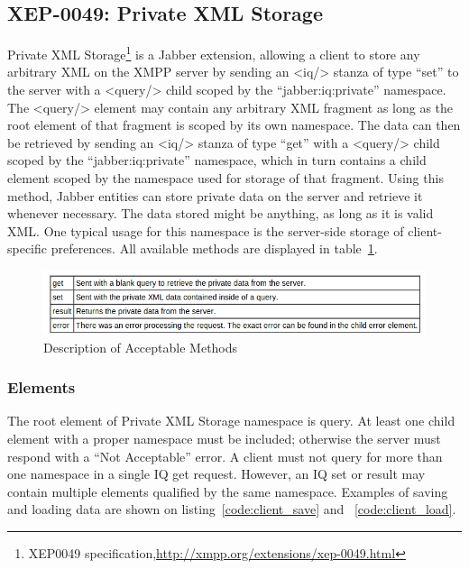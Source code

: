 

\subsection{XEP-0049: Private XML Storage}
	\label{xep0049}
	Private XML Storage\footnote{XEP0049 specification,\url{http://xmpp.org/extensions/xep-0049.html}} is a Jabber extension, allowing a client to store any arbitrary XML on the XMPP server by sending an <iq/> stanza of type ``set'' to the server with a <query/> child scoped by the ``jabber:iq:private'' namespace. The <query/> element may contain any arbitrary XML fragment as long as the root element of that fragment is scoped by its own namespace. The data can then be retrieved by sending an <iq/> stanza of type ``get'' with a <query/> child scoped by the ``jabber:iq:private'' namespace, which in turn contains a child element scoped by the namespace used for storage of that fragment. Using this method, Jabber entities can store private data on the server and retrieve it whenever necessary. The data stored might be anything, as long as it is valid XML. One typical usage for this namespace is the server-side storage of client-specific preferences. All available methods are displayed in table~\ref{img:xep49-methods}.
	
	\begin{figure}[!ht]
		\centering
		\includegraphics[scale=0.9]{images/xep0049Queries.png}   
		\caption[ Description of Acceptable Methods]{Description of Acceptable Methods}
		\label{img:xep49-methods}
		\end{figure}
	\subsubsection{Elements}
	The root element of Private XML Storage namespace is query. At least one child element with a proper namespace must be included; otherwise the server must respond with a ``Not Acceptable'' error. A client must not query for more than one namespace in a single IQ get request. However, an IQ set or result may contain multiple elements qualified by the same namespace. Examples of saving and loading data are shown on listing~\ref{code:client_save} and ~\ref{code:client_load}.

